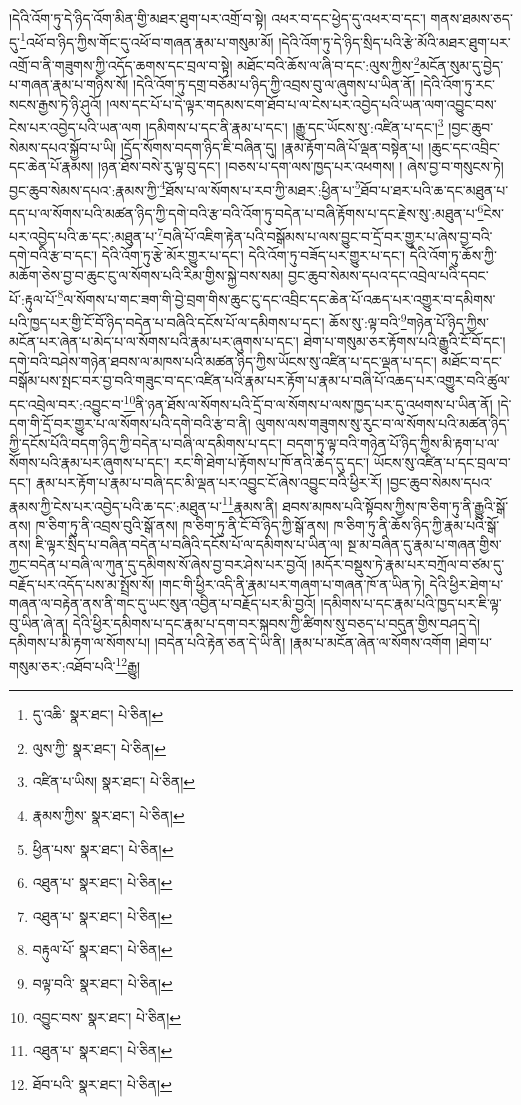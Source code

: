 །དེའི་འོག་ཏུ་དེ་ཉིད་འོག་མིན་གྱི་མཐར་ཐུག་པར་འགྲོ་བ་སྟེ། འཕར་བ་དང་ཕྱེད་དུ་འཕར་བ་དང་། གནས་ཐམས་ཅད་དུ་\footnote{དུ་འཆི་  སྣར་ཐང་།  པེ་ཅིན། }འཕོ་བ་ཉིད་ཀྱིས་གོང་དུ་འཕོ་བ་གཞན་རྣམ་པ་གསུམ་མོ། །དེའི་འོག་ཏུ་དེ་ཉིད་སྲིད་པའི་རྩེ་མོའི་མཐར་ཐུག་པར་འགྲོ་བ་ནི་གཟུགས་ཀྱི་འདོད་ཆགས་དང་བྲལ་བ་སྟེ། མཐོང་བའི་ཆོས་ལ་ཞི་བ་དང་:ལུས་ཀྱིས་\footnote{ལུས་ཀྱི་  སྣར་ཐང་།  པེ་ཅིན། }མངོན་སུམ་དུ་བྱེད་པ་གཞན་རྣམ་པ་གཉིས་སོ། །དེའི་འོག་ཏུ་དགྲ་བཅོམ་པ་ཉིད་ཀྱི་འབྲས་བུ་ལ་ཞུགས་པ་ཡིན་ནོ། །དེའི་འོག་ཏུ་རང་སངས་རྒྱས་ཏེ་ཉི་ཤུའོ། །ལས་དང་པོ་པ་དེ་ལྟར་གདམས་ངག་ཐོབ་པ་ལ་ངེས་པར་འབྱེད་པའི་ཡན་ལག་འབྱུང་བས་ངེས་པར་འབྱེད་པའི་ཡན་ལག །དམིགས་པ་དང་ནི་རྣམ་པ་དང་། །རྒྱུ་དང་ཡོངས་སུ་:འཛིན་པ་དང་།\footnote{འཛིན་པ་ཡིས།  སྣར་ཐང་།  པེ་ཅིན། } །བྱང་ཆུབ་སེམས་དཔའ་སྐྱོབ་པ་ཡི། །དྲོད་སོགས་བདག་ཉིད་ཇི་བཞིན་དུ། །རྣམ་རྟོག་བཞི་པོ་ལྡན་བསྟེན་པ། །ཆུང་དང་འབྲིང་དང་ཆེན་པོ་རྣམས། །ཉན་ཐོས་བསེ་རུ་ལྟ་བུ་དང་། །བཅས་པ་དག་ལས་ཁྱད་པར་འཕགས། །
ཞེས་བྱ་བ་གསུངས་ཏེ། བྱང་ཆུབ་སེམས་དཔའ་:རྣམས་ཀྱི་\footnote{རྣམས་ཀྱིས་  སྣར་ཐང་།  པེ་ཅིན། }ཐོས་པ་ལ་སོགས་པ་རབ་ཀྱི་མཐར་:ཕྱིན་པ་\footnote{ཕྱིན་པས་  སྣར་ཐང་།  པེ་ཅིན། }ཐོབ་པ་ཐར་པའི་ཆ་དང་མཐུན་པ་དད་པ་ལ་སོགས་པའི་མཚན་ཉིད་ཀྱི་དགེ་བའི་རྩ་བའི་འོག་ཏུ་བདེན་པ་བཞི་རྟོགས་པ་དང་རྗེས་སུ་:མཐུན་པ་\footnote{འཐུན་པ་  སྣར་ཐང་།  པེ་ཅིན། }ངེས་པར་འབྱེད་པའི་ཆ་དང་:མཐུན་པ་\footnote{འཐུན་པ་  སྣར་ཐང་།  པེ་ཅིན། }བཞི་པོ་འཇིག་རྟེན་པའི་བསྒོམས་པ་ལས་བྱུང་བ་དྲོ་བར་གྱུར་པ་ཞེས་བྱ་བའི་དགེ་བའི་རྩ་བ་དང་། དེའི་འོག་ཏུ་རྩེ་མོར་གྱུར་པ་དང་། དེའི་འོག་ཏུ་བཟོད་པར་གྱུར་པ་དང་། དེའི་འོག་ཏུ་ཆོས་ཀྱི་མཆོག་ཅེས་བྱ་བ་ཆུང་ངུ་ལ་སོགས་པའི་རིམ་གྱིས་སྐྱེ་བས་སམ། བྱང་ཆུབ་སེམས་དཔའ་དང་འབྲེལ་པའི་དབང་པོ་:རྟུལ་པོ་\footnote{བརྟུལ་པོ་  སྣར་ཐང་།  པེ་ཅིན། }ལ་སོགས་པ་གང་ཟག་གི་བྱེ་བྲག་གིས་ཆུང་ངུ་དང་འབྲིང་དང་ཆེན་པོ་འཆད་པར་འགྱུར་བ་དམིགས་པའི་ཁྱད་པར་གྱི་ངོ་བོ་ཉིད་བདེན་པ་བཞིའི་དངོས་པོ་ལ་དམིགས་པ་དང་། ཆོས་སུ་:ལྟ་བའི་\footnote{བལྟ་བའི་  སྣར་ཐང་།  པེ་ཅིན། }གཉེན་པོ་ཉིད་ཀྱིས་མངོན་པར་ཞེན་པ་མེད་པ་ལ་སོགས་པའི་རྣམ་པར་ཞུགས་པ་དང་། ཐེག་པ་གསུམ་ཅར་རྟོགས་པའི་རྒྱུའི་ངོ་བོ་དང་། དགེ་བའི་བཤེས་གཉེན་ཐབས་ལ་མཁས་པའི་མཚན་ཉིད་ཀྱིས་ཡོངས་སུ་འཛིན་པ་དང་ལྡན་པ་དང་། མཐོང་བ་དང་བསྒོམ་པས་སྤང་བར་བྱ་བའི་གཟུང་བ་དང་འཛིན་པའི་རྣམ་པར་རྟོག་པ་རྣམ་པ་བཞི་པོ་འཆད་པར་འགྱུར་བའི་ཚུལ་དང་འབྲེལ་བར་:འབྱུང་བ་\footnote{འབྱུང་བས་  སྣར་ཐང་།  པེ་ཅིན། }ནི་ཉན་ཐོས་ལ་སོགས་པའི་དྲོ་བ་ལ་སོགས་པ་ལས་ཁྱད་པར་དུ་འཕགས་པ་ཡིན་ནོ། །དེ་དག་གི་དྲོ་བར་གྱུར་པ་ལ་སོགས་པའི་དགེ་བའི་རྩ་བ་ནི། ལུགས་ལས་གཟུགས་སུ་རུང་བ་ལ་སོགས་པའི་མཚན་ཉིད་ཀྱི་དངོས་པོའི་བདག་ཉིད་ཀྱི་བདེན་པ་བཞི་ལ་དམིགས་པ་དང་། བདག་ཏུ་ལྟ་བའི་གཉེན་པོ་ཉིད་ཀྱིས་མི་རྟག་པ་ལ་སོགས་པའི་རྣམ་པར་ཞུགས་པ་དང་། རང་གི་ཐེག་པ་རྟོགས་པ་ཁོ་ནའི་ཆེད་དུ་དང་། ཡོངས་སུ་འཛིན་པ་དང་བྲལ་བ་དང་། རྣམ་པར་རྟོག་པ་རྣམ་པ་བཞི་དང་མི་ལྡན་པར་འབྱུང་ངོ་ཞེས་འབྱུང་བའི་ཕྱིར་རོ། །བྱང་ཆུབ་སེམས་དཔའ་རྣམས་ཀྱི་ངེས་པར་འབྱེད་པའི་ཆ་དང་:མཐུན་པ་\footnote{འཐུན་པ་  སྣར་ཐང་།  པེ་ཅིན། }རྣམས་ནི། ཐབས་མཁས་པའི་སྟོབས་ཀྱིས་ཁ་ཅིག་ཏུ་ནི་རྒྱུའི་སྒོ་ནས། ཁ་ཅིག་ཏུ་ནི་འབྲས་བུའི་སྒོ་ནས། ཁ་ཅིག་ཏུ་ནི་ངོ་བོ་ཉིད་ཀྱི་སྒོ་ནས། ཁ་ཅིག་ཏུ་ནི་ཆོས་ཉིད་ཀྱི་རྣམ་པའི་སྒོ་ནས། ཇི་ལྟར་སྲིད་པ་བཞིན་བདེན་པ་བཞིའི་དངོས་པོ་ལ་དམིགས་པ་ཡིན་ལ། སྔ་མ་བཞིན་དུ་རྣམ་པ་གཞན་གྱིས་ཀྱང་བདེན་པ་བཞི་ལ་ཀུན་དུ་དམིགས་སོ་ཞེས་བྱ་བར་ཤེས་པར་བྱའོ། །མདོར་བསྡུས་ཏེ་རྣམ་པར་བཀྲོལ་བ་ཙམ་དུ་བརྗོད་པར་འདོད་པས་མ་སྤྲོས་སོ། །གང་གི་ཕྱིར་འདི་ནི་རྣམ་པར་གཞག་པ་གཞན་ཁོ་ན་ཡིན་ཏེ། དེའི་ཕྱིར་ཐེག་པ་གཞན་ལ་བརྟེན་ནས་ནི་གང་དུ་ཡང་སུན་འབྱིན་པ་བརྗོད་པར་མི་བྱའོ། །དམིགས་པ་དང་རྣམ་པའི་ཁྱད་པར་ཇི་ལྟ་བུ་ཡིན་ཞེ་ན། དེའི་ཕྱིར་དམིགས་པ་དང་རྣམ་པ་དག་བར་སྐབས་ཀྱི་ཚིགས་སུ་བཅད་པ་བདུན་གྱིས་བཤད་དེ། དམིགས་པ་མི་རྟག་ལ་སོགས་པ། །བདེན་པའི་རྟེན་ཅན་དེ་ཡི་ནི། །རྣམ་པ་མངོན་ཞེན་ལ་སོགས་འགོག །ཐེག་པ་གསུམ་ཅར་:འཐོབ་པའི་\footnote{ཐོབ་པའི་  སྣར་ཐང་།  པེ་ཅིན། }རྒྱུ། 